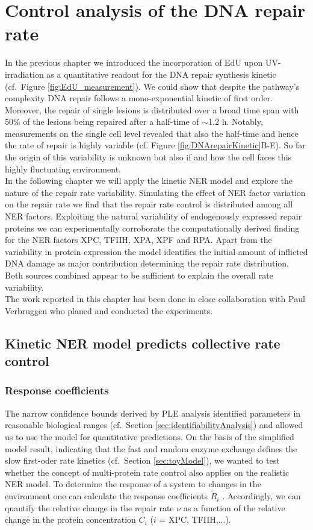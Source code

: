 \chapter{Control analysis of the DNA repair rate}

In the previous chapter we introduced the incorporation of EdU upon UV-irradiation as a quantitative readout for the DNA repair synthesis kinetic (cf.\ Figure \ref{fig:EdU_measurement}). We could show that despite the pathway's complexity DNA repair follows a mono-exponential kinetic of first order. Moreover, the repair of single lesions is distributed over a broad time span with 50\% of the lesions being repaired after a half-time of $\sim$1.2 h. Notably, measurements on the single cell level revealed that also the half-time and hence the rate of repair is highly variable (cf. Figure \ref{fig:DNArepairKinetic}B-E). So far the origin of this variability is unknown but also if and how the cell faces this highly fluctuating environment.\\  
In the following chapter we will apply the kinetic NER model and explore the nature of the repair rate variability. Simulating the effect of NER factor variation on the repair rate we find that the repair rate control is distributed among all NER factors. Exploiting the natural variability of endogenously expressed repair proteins we can experimentally corroborate the computationally derived finding for the NER factors XPC, TFIIH, XPA, XPF and RPA. Apart from the variability in protein expression the model identifies the initial amount of inflicted DNA damage as major contribution determining the repair rate distribution. Both sources combined appear to be sufficient to explain the overall rate variability.\\     

The work reported in this chapter has been done in close collaboration with Paul Verbruggen who planed and conducted the experiments.

\section{Kinetic NER model predicts collective rate control}

 
\subsection{Response coefficients}

The narrow confidence bounds derived by PLE analysis identified parameters in reasonable biological ranges (cf.\ Section \ref{sec:identifiabilityAnalysis}) and allowed us to use the model for quantitative predictions. On the basis of the simplified model result, indicating that the fast and random enzyme exchange defines the slow first-oder rate kinetics (cf.\ Section \ref{sec:toyModel}), we wanted to test whether the concept of multi-protein rate control also applies on the realistic NER model. To determine the response of a system to changes in the environment one can calculate the response coefficients $\tilde{R}_i$ \cite{Hofmeyr1991,Fell1992}. Accordingly, we can quantify the relative change in the repair rate $\nu$ as a function of the relative change in the protein concentration $C_i$ ($i$ = XPC, TFIIH,...).

